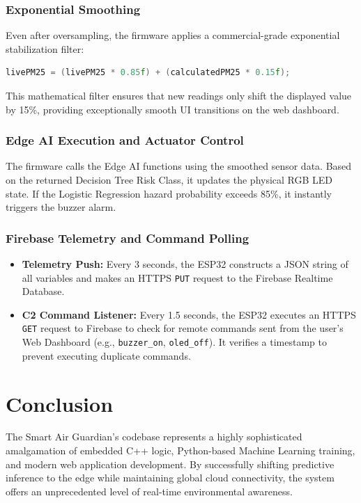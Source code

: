 \documentclass[12pt,a4paper]{article}
\begin{document}
\subsubsection{Exponential Smoothing}
Even after oversampling, the firmware applies a commercial-grade exponential stabilization filter:
\begin{lstlisting}[language=C++]
livePM25 = (livePM25 * 0.85f) + (calculatedPM25 * 0.15f);
\end{lstlisting}
This mathematical filter ensures that new readings only shift the displayed value by 15\%, providing exceptionally smooth UI transitions on the web dashboard.

\subsubsection{Edge AI Execution and Actuator Control}
The firmware calls the Edge AI functions using the smoothed sensor data. Based on the returned Decision Tree Risk Class, it updates the physical RGB LED state. If the Logistic Regression hazard probability exceeds 85\%, it instantly triggers the buzzer alarm.

\subsubsection{Firebase Telemetry and Command Polling}
\begin{itemize}
    \item \textbf{Telemetry Push:} Every 3 seconds, the ESP32 constructs a JSON string of all variables and makes an HTTPS \texttt{PUT} request to the Firebase Realtime Database.
    \item \textbf{C2 Command Listener:} Every 1.5 seconds, the ESP32 executes an HTTPS \texttt{GET} request to Firebase to check for remote commands sent from the user's Web Dashboard (e.g., \texttt{buzzer\_on}, \texttt{oled\_off}). It verifies a timestamp to prevent executing duplicate commands.
\end{itemize}

\section{Conclusion}
The Smart Air Guardian's codebase represents a highly sophisticated amalgamation of embedded C++ logic, Python-based Machine Learning training, and modern web application development. By successfully shifting predictive inference to the edge while maintaining global cloud connectivity, the system offers an unprecedented level of real-time environmental awareness.
\end{document}
